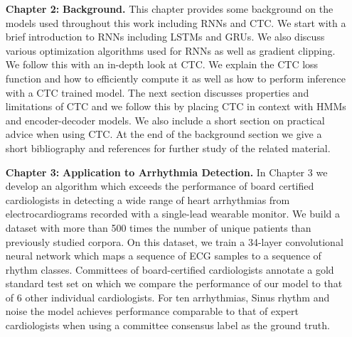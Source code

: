 \begin{itemize}
    \setlength{\itemindent}{3.4em}
    \item[{\bf Chapter 2:}]{\bf Background.} This chapter provides some
        background on the models used throughout this work including RNNs and
        CTC. We start with a brief introduction to RNNs including LSTMs and
        GRUs. We also discuss various optimization algorithms used for RNNs as
        well as gradient clipping. We follow this with an in-depth look at CTC.
        We explain the CTC loss function and how to efficiently compute it as
        well as how to perform inference with a CTC trained model. The next
        section discusses properties and limitations of CTC and we follow this
        by placing CTC in context with HMMs and encoder-decoder models. We also
        include a short section on practical advice when using CTC. At the end
        of the background section we give a short bibliography and references
        for further study of the related material. 

    \item [{\bf Chapter 3:}]{\bf Application to Arrhythmia Detection.} In
        Chapter 3 we develop an algorithm which exceeds the performance of
        board certified cardiologists in detecting a wide range of heart
        arrhythmias from electrocardiograms recorded with a single-lead
        wearable monitor. We build a dataset with more than 500 times the
        number of unique patients than previously studied corpora. On this
        dataset, we train a 34-layer convolutional neural network which maps a
        sequence of ECG samples to a sequence of rhythm classes. Committees of
        board-certified cardiologists annotate a gold standard test set on
        which we compare the performance of our model to that of 6 other
        individual cardiologists. For ten arrhythmias, Sinus rhythm and noise
        the model achieves performance comparable to that of expert
        cardiologists when using a committee consensus label as the ground
        truth.


\end{itemize}
